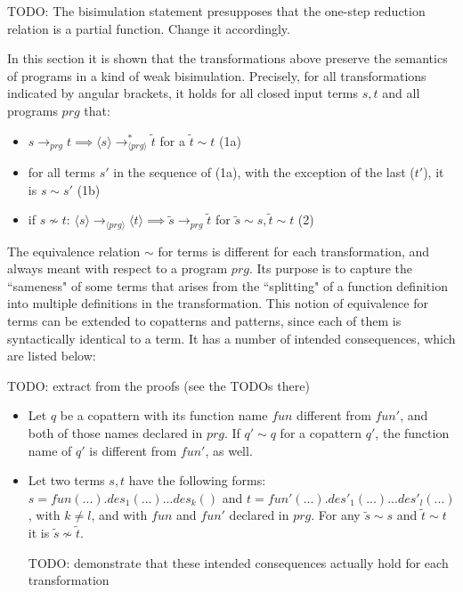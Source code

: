 \documentclass[11pt]{article} %
\begin{document}
TODO: The bisimulation statement presupposes that the one-step reduction relation is a partial function. Change it accordingly.

In this section it is shown that the transformations above preserve the semantics of programs in a kind of weak bisimulation. Precisely, for all transformations indicated by angular brackets, it holds for all closed input terms $s, t$ and all programs $prg$ that:

\begin{itemize}
\item $s \longrightarrow_{prg} t \implies \langle s \rangle  \longrightarrow^*_{\langle prg \rangle} \tilde{t}$ for a $\tilde{t} \sim t$ (1a)

\item for all terms $s'$ in the sequence of (1a), with the exception of the last ($t'$), it is $s \sim s'$ (1b)

\item if $s \not\sim t$: $\langle s \rangle \longrightarrow_{\langle prg \rangle} \langle t \rangle \implies \tilde{s} \longrightarrow_{prg} \tilde{t}$ for $\tilde{s} \sim s, \tilde{t} \sim t$ (2)

\end{itemize}

The equivalence relation $\sim$ for terms is different for each transformation, and always meant with respect to a program $prg$. Its purpose is to capture the ``sameness" of some terms that arises from the ``splitting" of a function definition into multiple definitions in the transformation. This notion of equivalence for terms can be extended to copatterns and patterns, since each of them is syntactically identical to a term. It has a number of intended consequences, which are listed below:

TODO: extract from the proofs (see the TODOs there)

\begin{itemize}

\item Let $q$ be a copattern with its function name $fun$ different from $fun'$, and both of those names declared in $prg$. If $q' \sim q$ for a copattern $q'$, the function name of $q'$ is different from $fun'$, as well.

\item Let two terms $s,t$ have the following forms: $s = fun(...).des_1(...)...des_k()$ and $t = fun'(...).des'_1(...)...des'_l(...)$, with $k \neq l$, and with $fun$ and $fun'$ declared in $prg$. For any $\widetilde{s} \sim s$ and $\widetilde{t} \sim t$ it is $\widetilde{s} \not\sim \widetilde{t}$.

TODO: demonstrate that these intended consequences actually hold for each transformation

\end{itemize}
\end{document}
